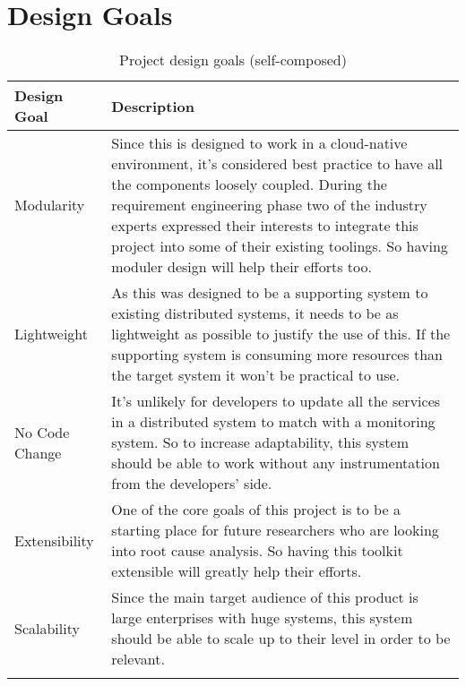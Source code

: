 \section{Design Goals}
\begin{longtable}{|p{22mm}|p{131mm}|}
\hline
\textbf{Design Goal} &
    \textbf{Description} \\ \hline
    Modularity &
    Since this is designed to work in a cloud-native environment, it’s considered best practice to have all the components loosely coupled. During the requirement engineering phase two of the industry experts expressed their interests to integrate this project into some of their existing toolings. So having moduler design will help their efforts too. \\ \hline
    
    Lightweight &
    As this was designed to be a supporting system to existing distributed systems, it needs to be as lightweight as possible to justify the use of this. If the supporting system is consuming more resources than the target system it won’t be practical to use. \\ \hline
    
    No Code Change &
    It’s unlikely for developers to update all the services in a distributed system to match with a monitoring system. So to increase adaptability, this system should be able to work without any instrumentation from the developers’ side. \\ \hline
    
    Extensibility &
    One of the core goals of this project is to be a starting place for future researchers who are looking into root cause analysis. So having this toolkit extensible will greatly help their efforts. \\ \hline
    
    Scalability &
    Since the main target audience of this product is large enterprises with huge systems, this system should be able to scale up to their level in order to be relevant. \\ \hline

    \caption{Project design goals (self-composed)}
\end{longtable}